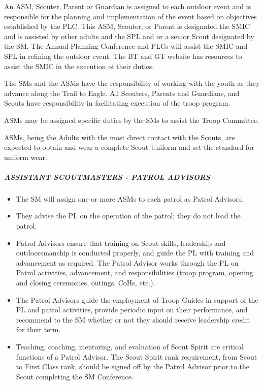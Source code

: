 \documentclass{ltxguide}
\begin{document}
An \ac{ASM}, Scouter, Parent or Guardian is assigned to each outdoor event and is responsible for the planning      and implementation of the event based on objectives established by the \ac{PLC}. This \ac{ASM}, Scouter, or Parent is designated the \ac{SMIC} and is assisted by other adults and the \ac{SPL} and or a senior Scout designated by the \ac{SM}. The Annual Planning Conference and \ac{PLC}s will assist the \ac{SMIC} and \ac{SPL} in refining the outdoor event. The \ac{BT} and \ac{GT} website has resources to assist the \ac{SMIC} in the execution of their duties.

The \acp{SM} and the \acp{ASM} have the responsibility of working with the youth as they advance along the Trail to Eagle. All Scouters, Parents and Guardians, and Scouts have responsibility in facilitating execution of the troop program.

\Acp{ASM} may be assigned specific duties by the \acp{SM} to assist the Troop Committee.

\Acp{ASM}, being the Adults with the most direct contact with the Scouts, are expected to obtain and wear a complete Scout Uniform and set the standard for uniform wear.

\subparagraph{ASSISTANT SCOUTMASTERS - PATROL ADVISORS}
\begin{itemize}
	\item The \ac{SM} will assign one or more \acp{ASM} to each patrol as Patrol Advisors.
	\item They advise the \ac{PL} on the operation of the patrol; they do not lead the patrol.
	\item Patrol Advisors ensure that training on Scout skills, leadership and outdoorsmanship is conducted properly, and guide the \ac{PL} with training and advancement as required. The Patrol Advisor works through the \ac{PL} on Patrol activities, advancement, and responsibilities (troop program, opening and closing ceremonies, outings, \acp{CoH}, etc.).
	\item The Patrol Advisors guide the employment of Troop Guides in support of the \ac{PL} and patrol activities, provide periodic input on their performance, and recommend to the \ac{SM} whether or not they should receive leadership credit for their term.
	\item Teaching, coaching, mentoring, and evaluation of Scout Spirit are critical functions of a Patrol Advisor. The Scout Spirit rank requirement, from Scout to First Class rank, should be signed off by the Patrol Advisor prior to the Scout completing the \ac{SM} Conference.
\end{itemize}
\end{document}

